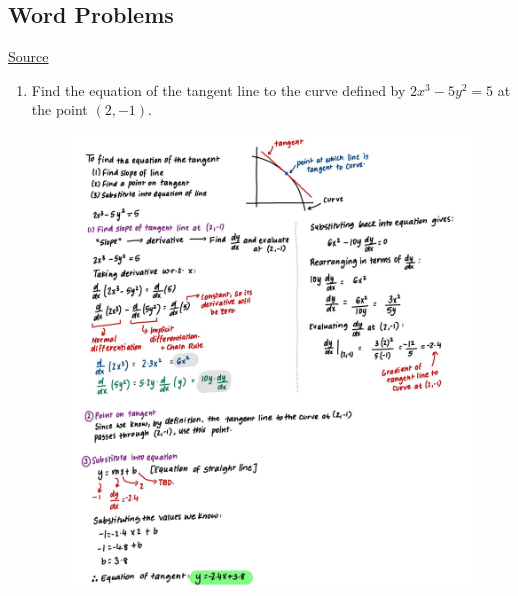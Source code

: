 \documentclass{article}
\begin{document}
\pagebreak
\subsection*{Word Problems}
\href{https://www.rit.edu/academicsuccesscenter/sites/rit.edu.academicsuccesscenter/files/documents/math-handouts/C4_ImplicitDifferentiationandRelatedRates_BP_5_6_19.pdf}{Source}
\begin{enumerate}
    \item Find the equation of the tangent line to the curve defined by $2x^3-5y^2=5$ at the point $(2, -1)$.
     \begin{figure}[H]
        \centering
        \includegraphics[width=\linewidth]{Q7.jpg}
        \label{fig:Q7}
    \end{figure}


\end{enumerate}
\end{document}
